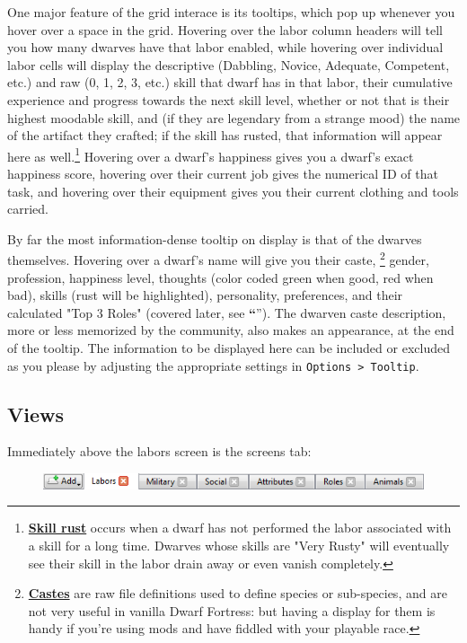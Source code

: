 \documentclass[]{article}
\newcommand{\jump}[1] {\textbf{``\nameref{sec:#1}}''}
\begin{document}
One major feature of the grid interace is its tooltips, which pop up whenever you hover over a space in
the grid. Hovering over the labor column headers will tell you how many dwarves have that labor enabled,
while hovering over individual labor cells will display the descriptive (Dabbling, Novice, Adequate,
Competent, etc.) and raw (0, 1, 2, 3, etc.) skill that dwarf has in that labor, their cumulative
experience and progress towards the next skill level, whether or not that is their highest moodable
skill, and (if they are legendary from a strange mood) the name of the artifact they crafted; if the
skill has rusted, that information will appear here as well.\footnote{
\href{http://dwarffortresswiki.org/index.php/DF2012:Skill\#Skill_rust}{\textbf{Skill rust}} occurs when
a dwarf has not performed the labor associated with a skill for a long time. Dwarves whose skills are
"Very Rusty" will eventually see their skill in the labor drain away or even vanish completely.}
Hovering over a dwarf's happiness gives you a dwarf's exact happiness score, hovering over their current
job gives the numerical ID of that task, and hovering over their equipment gives you their current
clothing and tools carried.

By far the most information-dense tooltip on display is that of the dwarves themselves. Hovering over a
dwarf's name will give you their caste,
\footnote{\href{http://dwarffortresswiki.org/index.php/DF2012:Caste}{\textbf{Castes}} are raw file
definitions used to define species or sub-species, and are not very useful in vanilla Dwarf Fortress:
but having a display for them is handy if you're using mods and have fiddled with your playable race.}
gender, profession, happiness level, thoughts (color coded green when good, red when bad), skills (rust
will be highlighted), personality, preferences, and their calculated "Top 3 Roles" (covered later, see
\jump{Roles}). The dwarven caste description, more or less memorized by the community, also makes an
appearance, at the end of the tooltip. The information to be displayed here can be included or excluded
as you please by adjusting the appropriate settings in \texttt{Options > Tooltip}.

\newpage

\subsection{Views}
\label{sec:Screens Tab}
Immediately above the labors screen is the screens tab:

\begin{figure}[h!]
\centering
\includegraphics{Sec1Fig9}
\end{figure}
\end{document}
